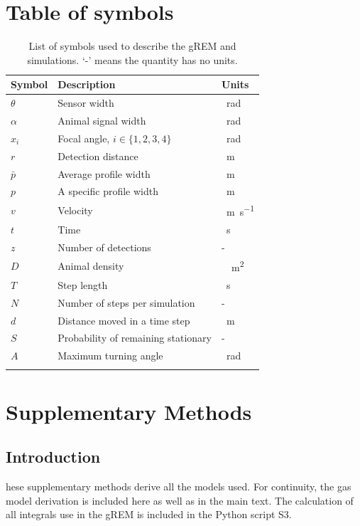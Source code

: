   

\clearpage
\section{Table of symbols}

\begin{table}[h!]
\centering
\begin{tabular}{lll}
Symbol 	& Description & Units\\\hline
$\theta$	& Sensor width & \SI{}{\radian} \\
$\alpha$	& Animal signal width & \SI{}{\radian} \\
$x_i$	        & Focal angle, $i \in \{1,2,3,4\} $ 	& \SI{}{\radian}\\
$r$ 		& Detection distance & \SI{}{\meter}\\
$\bar{p}$ 		& Average profile width & \SI{}{\meter}\\
$p$ 		& A specific profile width & \SI{}{\meter}\\
$v$		& Velocity & \SI{}{\meter\per\second}\\
$t$		& Time & \SI{}{\second}\\
$z$		& Number of detections & -\\
$D$		& Animal density & \SI{}{\per\meter\squared} \\
$T$ 		& Step length & \SI{}{\second}\\
$N$ 		& Number of steps per simulation & -\\
$d$ 		& Distance moved in a time step & \SI{}{\meter}\\
$S$ 		& Probability of remaining stationary & -\\
$A$ 		& Maximum turning angle & \SI{}{\radian}\\
\\
\end{tabular}
\caption{List of symbols used to describe the gREM and simulations. `-' means the quantity has no units.}
\label{t:paras}
\end{table}

\clearpage

\section{Supplementary Methods}
\subsection{Introduction}
hese supplementary methods derive all the models used. 
For continuity, the gas model derivation is included here as well as in the main text. 
The calculation of all integrals use in the gREM is included in the Python script S3. 


